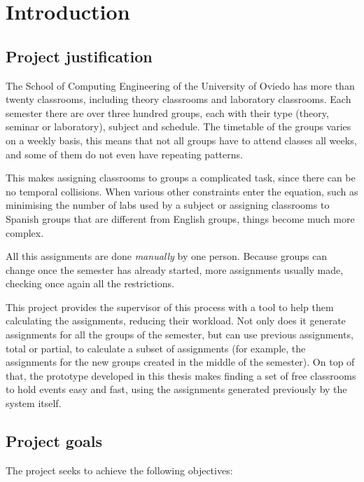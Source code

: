 \renewcommand{\documentname}{Introduction}

\chapter{Introduction}


\section{Project justification}

The School of Computing Engineering of the University of Oviedo has more than twenty classrooms, including theory classrooms and laboratory classrooms. Each semester there are over three hundred groups, each with their type (theory, seminar or laboratory), subject and schedule. The timetable of the groups varies on a weekly basis, this means that not all groups have to attend classes all weeks, and some of them do not even have repeating patterns.

This makes assigning classrooms to groups a complicated task, since there can be no temporal collisions. When various other constraints enter the equation, such as minimising the number of labs used by a subject or assigning classrooms to Spanish groups that are different from English groups, things become much more complex.

All this assignments are done \textit{manually} by one person. Because groups can change once the semester has already started, more assignments usually made, checking once again all the restrictions.

This project provides the supervisor of this process with a tool to help them calculating the assignments, reducing their workload. Not only does it generate assignments for all the groups of the semester, but can use previous assignments, total or partial, to calculate a subset of assignments (for example, the assignments for the new groups created in the middle of the semester). On top of that, the prototype developed in this thesis makes finding a set of free classrooms to hold events easy and fast, using the assignments generated previously by the system itself.


\section{Project goals}

The project seeks to achieve the following objectives:

